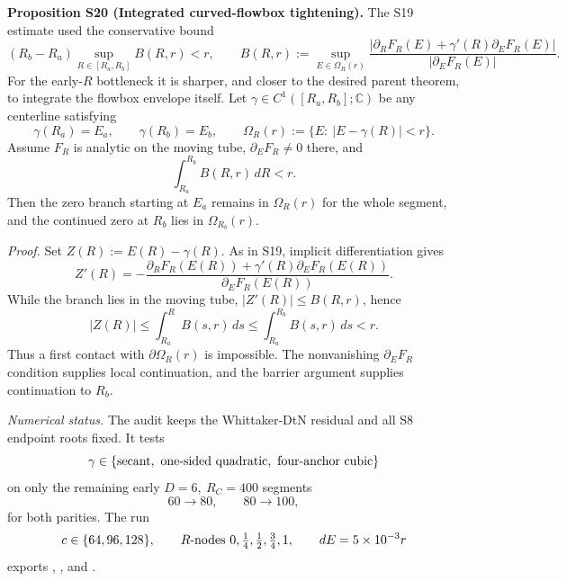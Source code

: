 \documentclass[aps,prd,onecolumn,notitlepage,nofootinbib,superscriptaddress,11pt,floatfix]{revtex4-2}
\begin{document}
\medskip\noindent\textbf{Proposition S20 (Integrated curved-flowbox tightening).}
The S19 estimate used the conservative bound
\[
(R_b-R_a)\sup_{R\in[R_a,R_b]}B(R,r)<r,
\qquad
B(R,r):=
\sup_{E\in\Omega_R(r)}
\frac{|\partial_RF_R(E)+\gamma'(R)\partial_EF_R(E)|}
     {|\partial_EF_R(E)|}.
\]
For the early-\(R\) bottleneck it is sharper, and closer to the desired
parent theorem, to integrate the flowbox envelope itself.  Let
\(\gamma\in C^1([R_a,R_b];\mathbb C)\) be any centerline satisfying
\[
\gamma(R_a)=E_a,\qquad \gamma(R_b)=E_b,
\qquad
\Omega_R(r):=\{E:\ |E-\gamma(R)|<r\}.
\]
Assume \(F_R\) is analytic on the moving tube, \(\partial_EF_R\ne0\) there,
and
\[
\int_{R_a}^{R_b} B(R,r)\,dR<r.
\]
Then the zero branch starting at \(E_a\) remains in \(\Omega_R(r)\) for the
whole segment, and the continued zero at \(R_b\) lies in \(\Omega_{R_b}(r)\).

\emph{Proof.}
Set \(Z(R):=E(R)-\gamma(R)\).  As in S19, implicit differentiation gives
\[
Z'(R)=
-\frac{\partial_RF_R(E(R))+\gamma'(R)\partial_EF_R(E(R))}
       {\partial_EF_R(E(R))}.
\]
While the branch lies in the moving tube, \(|Z'(R)|\le B(R,r)\), hence
\[
|Z(R)|\le \int_{R_a}^{R}B(s,r)\,ds
\le \int_{R_a}^{R_b}B(s,r)\,ds<r.
\]
Thus a first contact with \(\partial\Omega_R(r)\) is impossible.  The
nonvanishing \(\partial_EF_R\) condition supplies local continuation, and the
barrier argument supplies continuation to \(R_b\).

\emph{Numerical status.}
The audit  keeps the
Whittaker-DtN residual and all S8 endpoint roots fixed.  It tests
\[
\gamma\in
\{\hbox{secant},\ \hbox{one-sided quadratic},\ \hbox{four-anchor cubic}\}
\]
on only the remaining early \(D=6,\ R_C=400\) segments
\[
60\to80,\qquad 80\to100,
\]
for both parities.  The run
\[
c\in\{64,96,128\},\qquad
R\hbox{-nodes }0,\tfrac14,\tfrac12,\tfrac34,1,
\qquad dE=5\times10^{-3}r
\]
exports ,
, and
.
\end{document}
